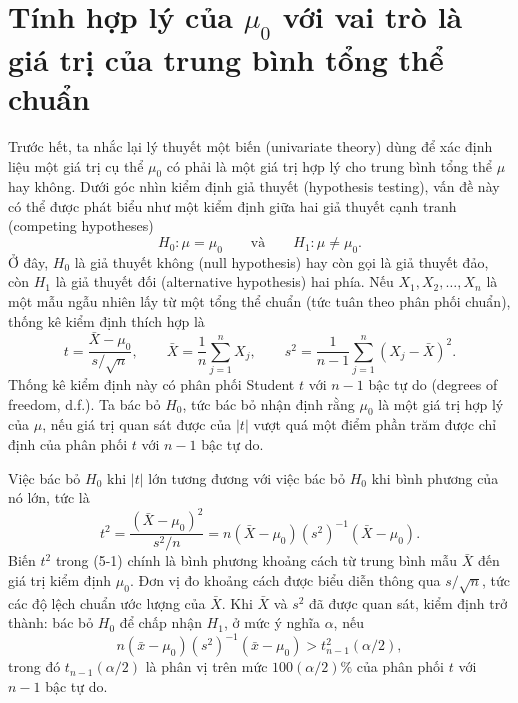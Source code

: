 
\section{Tính hợp lý của \texorpdfstring{\(\mu_0\)}{mu0} với vai trò là giá trị của trung bình tổng thể chuẩn}
\label{sec:ch05-02}

Trước hết, ta nhắc lại lý thuyết một biến (univariate theory) dùng để xác định
liệu một giá trị cụ thể \(\mu_0\) có phải là một giá trị hợp lý cho trung bình tổng
thể \(\mu\) hay không. Dưới góc nhìn kiểm định giả thuyết (hypothesis testing),
vấn đề này có thể được phát biểu như một kiểm định giữa hai giả thuyết cạnh tranh
(competing hypotheses)
\[
  H_0: \mu = \mu_0
  \qquad\text{và}\qquad
  H_1: \mu \ne \mu_0.
\]
Ở đây, \(H_0\) là giả thuyết không (null hypothesis) hay còn gọi là giả thuyết đảo, còn \(H_1\) là giả thuyết đối
(alternative hypothesis) hai phía. Nếu \(X_1, X_2, \ldots, X_n\) là một mẫu ngẫu
nhiên lấy từ một tổng thể chuẩn (tức tuân theo phân phối chuẩn), thống kê kiểm định thích hợp là
\[
  t = \frac{\bar{X} - \mu_0}{s/\sqrt{n}},
  \qquad
  \bar{X} = \frac{1}{n}\sum_{j=1}^{n} X_j,
  \qquad
  s^2 = \frac{1}{n-1}\sum_{j=1}^{n}(X_j - \bar{X})^2.
\]
Thống kê kiểm định này có phân phối Student \(t\) với \(n-1\) bậc tự do (degrees
of freedom, d.f.). Ta bác bỏ \(H_0\), tức bác bỏ nhận định rằng \(\mu_0\) là một
giá trị hợp lý của \(\mu\), nếu giá trị quan sát được của \(|t|\) vượt quá một điểm
phần trăm được chỉ định của phân phối \(t\) với \(n-1\) bậc tự do.

Việc bác bỏ \(H_0\) khi \(|t|\) lớn tương đương với việc bác bỏ \(H_0\) khi bình
phương của nó lớn, tức là
\begin{equation}
  t^2
  = \frac{(\bar{X}-\mu_0)^2}{s^2/n}
  = n(\bar{X}-\mu_0)(s^2)^{-1}(\bar{X}-\mu_0).
\end{equation}
Biến \(t^2\) trong (5-1) chính là bình phương khoảng cách từ trung bình mẫu
\(\bar{X}\) đến giá trị kiểm định \(\mu_0\). Đơn vị đo khoảng cách được biểu diễn
thông qua \(s/\sqrt{n}\), tức các độ lệch chuẩn ước lượng của \(\bar{X}\). Khi
\(\bar{X}\) và \(s^2\) đã được quan sát, kiểm định trở thành: bác bỏ \(H_0\) để
chấp nhận \(H_1\), ở mức ý nghĩa \(\alpha\), nếu
\begin{equation}
  n(\bar{x}-\mu_0)(s^2)^{-1}(\bar{x}-\mu_0)
  > t^2_{n-1}(\alpha/2),
\end{equation}
trong đó \(t_{n-1}(\alpha/2)\) là phân vị trên mức \(100(\alpha/2)\%\) của phân phối
\(t\) với \(n-1\) bậc tự do.

